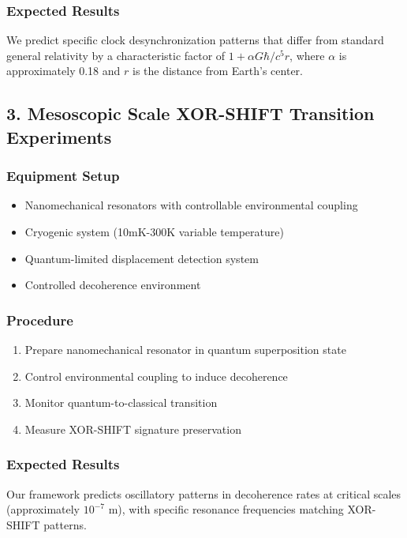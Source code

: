 \documentclass[10pt]{article}
\begin{document}
\subsubsection*{Expected Results}
We predict specific clock desynchronization patterns that differ from standard general relativity by a characteristic factor of $1 + \alpha G\hbar/c^5r$, where $\alpha$ is approximately 0.18 and $r$ is the distance from Earth's center.

\subsection*{3. Mesoscopic Scale XOR-SHIFT Transition Experiments}

\subsubsection*{Equipment Setup}
\begin{itemize}
\item Nanomechanical resonators with controllable environmental coupling
\item Cryogenic system (10mK-300K variable temperature)
\item Quantum-limited displacement detection system
\item Controlled decoherence environment
\end{itemize}

\subsubsection*{Procedure}
\begin{enumerate}
\item Prepare nanomechanical resonator in quantum superposition state
\item Control environmental coupling to induce decoherence
\item Monitor quantum-to-classical transition
\item Measure XOR-SHIFT signature preservation
\end{enumerate}

\subsubsection*{Expected Results}
Our framework predicts oscillatory patterns in decoherence rates at critical scales (approximately $10^{-7}$ m), with specific resonance frequencies matching XOR-SHIFT patterns.
\end{document}
